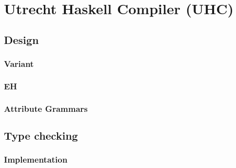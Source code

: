 \chapter{Utrecht Haskell Compiler (UHC)}

\section{Design}

\subsection{Variant}

\subsection{EH}

\subsection{Attribute Grammars}

\section{Type checking}

\subsection{Implementation}
